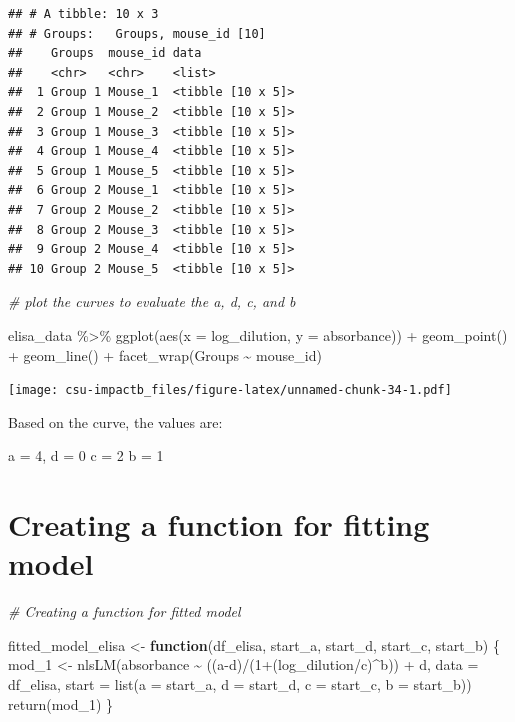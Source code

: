 \documentclass[
]{book}
\newenvironment{Shaded}{\begin{snugshade}}{\end{snugshade}}
\newcommand{\AttributeTok}[1]{\textcolor[rgb]{0.77,0.63,0.00}{#1}}
\newcommand{\CommentTok}[1]{\textcolor[rgb]{0.56,0.35,0.01}{\textit{#1}}}
\newcommand{\ControlFlowTok}[1]{\textcolor[rgb]{0.13,0.29,0.53}{\textbf{#1}}}
\newcommand{\DecValTok}[1]{\textcolor[rgb]{0.00,0.00,0.81}{#1}}
\newcommand{\FunctionTok}[1]{\textcolor[rgb]{0.00,0.00,0.00}{#1}}
\newcommand{\NormalTok}[1]{#1}
\newcommand{\OtherTok}[1]{\textcolor[rgb]{0.56,0.35,0.01}{#1}}
\newcommand{\SpecialCharTok}[1]{\textcolor[rgb]{0.00,0.00,0.00}{#1}}
\begin{document}
\begin{verbatim}
## # A tibble: 10 x 3
## # Groups:   Groups, mouse_id [10]
##    Groups  mouse_id data             
##    <chr>   <chr>    <list>           
##  1 Group 1 Mouse_1  <tibble [10 x 5]>
##  2 Group 1 Mouse_2  <tibble [10 x 5]>
##  3 Group 1 Mouse_3  <tibble [10 x 5]>
##  4 Group 1 Mouse_4  <tibble [10 x 5]>
##  5 Group 1 Mouse_5  <tibble [10 x 5]>
##  6 Group 2 Mouse_1  <tibble [10 x 5]>
##  7 Group 2 Mouse_2  <tibble [10 x 5]>
##  8 Group 2 Mouse_3  <tibble [10 x 5]>
##  9 Group 2 Mouse_4  <tibble [10 x 5]>
## 10 Group 2 Mouse_5  <tibble [10 x 5]>
\end{verbatim}

\begin{Shaded}
\begin{Highlighting}[]
\CommentTok{\# plot the curves to evaluate the a, d, c, and b}

\NormalTok{elisa\_data }\SpecialCharTok{\%\textgreater{}\%}
  \FunctionTok{ggplot}\NormalTok{(}\FunctionTok{aes}\NormalTok{(}\AttributeTok{x =}\NormalTok{ log\_dilution, }\AttributeTok{y =}\NormalTok{ absorbance)) }\SpecialCharTok{+}
  \FunctionTok{geom\_point}\NormalTok{() }\SpecialCharTok{+}
  \FunctionTok{geom\_line}\NormalTok{() }\SpecialCharTok{+} 
  \FunctionTok{facet\_wrap}\NormalTok{(Groups }\SpecialCharTok{\textasciitilde{}}\NormalTok{ mouse\_id)}
\end{Highlighting}
\end{Shaded}

\texttt{[image: csu-impactb\_files/figure-latex/unnamed-chunk-34-1.pdf]}

Based on the curve, the values are:

a = 4,
d = 0
c = 2
b = 1

\hypertarget{creating-a-function-for-fitting-model}{%
\section{Creating a function for fitting model}\label{creating-a-function-for-fitting-model}}

\begin{Shaded}
\begin{Highlighting}[]
\CommentTok{\# Creating a function for fitted model}

\NormalTok{fitted\_model\_elisa }\OtherTok{\textless{}{-}} \ControlFlowTok{function}\NormalTok{(df\_elisa, start\_a, start\_d, start\_c, start\_b) \{}
\NormalTok{  mod\_1 }\OtherTok{\textless{}{-}} \FunctionTok{nlsLM}\NormalTok{(absorbance }\SpecialCharTok{\textasciitilde{}}\NormalTok{ ((a}\SpecialCharTok{{-}}\NormalTok{d)}\SpecialCharTok{/}\NormalTok{(}\DecValTok{1}\SpecialCharTok{+}\NormalTok{(log\_dilution}\SpecialCharTok{/}\NormalTok{c)}\SpecialCharTok{\^{}}\NormalTok{b)) }\SpecialCharTok{+}\NormalTok{ d,}
\AttributeTok{data =}\NormalTok{ df\_elisa,}
\AttributeTok{start =} \FunctionTok{list}\NormalTok{(}\AttributeTok{a =}\NormalTok{ start\_a, }\AttributeTok{d =}\NormalTok{ start\_d, }\AttributeTok{c =}\NormalTok{ start\_c, }\AttributeTok{b =}\NormalTok{ start\_b))}
  \FunctionTok{return}\NormalTok{(mod\_1)}
\NormalTok{\}}
\end{Highlighting}
\end{Shaded}
\end{document}

